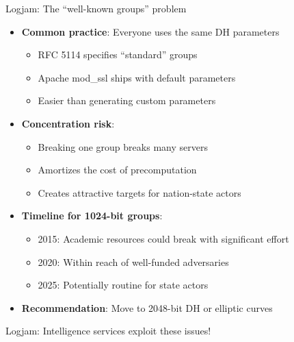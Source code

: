 \documentclass[aspectratio=169, lualatex, handout]{beamer}
\begin{document}
\begin{frame}{Logjam: The ``well-known groups'' problem}
	\begin{itemize}[<+->]
		\item \textbf{Common practice}: Everyone uses the same DH parameters
		      \begin{itemize}
			      \item RFC 5114 specifies ``standard'' groups
			      \item Apache mod\_ssl ships with default parameters
			      \item Easier than generating custom parameters
		      \end{itemize}
		\item \textbf{Concentration risk}:
		      \begin{itemize}
			      \item Breaking one group breaks many servers
			      \item Amortizes the cost of precomputation
			      \item Creates attractive targets for nation-state actors
		      \end{itemize}
		\item \textbf{Timeline for 1024-bit groups}:
		      \begin{itemize}
			      \item 2015: Academic resources could break with significant effort
			      \item 2020: Within reach of well-funded adversaries
			      \item 2025: Potentially routine for state actors
		      \end{itemize}
		\item \textbf{Recommendation}: Move to 2048-bit DH or elliptic curves
	\end{itemize}
\end{frame}

\begin{frame}{Logjam: Intelligence services exploit these issues!}
\end{frame}
\end{document}
